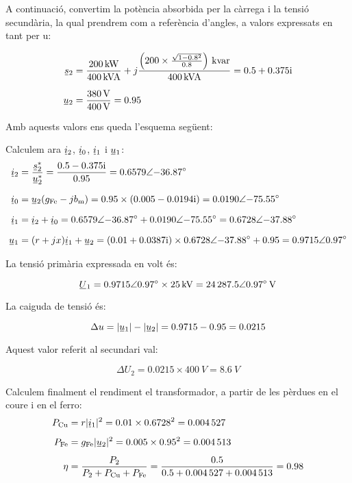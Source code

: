 \begin{exemple}
        A continuació, convertim la potència absorbida per la càrrega i la tensió secundària, la qual prendrem com a referència d'angles,  a valors expressats en tant per u:
        
  \begin{align*}
    \cmplx{s}_2 &= \frac{\qty{200}{kW}}{\qty{400}{kVA}} + j \frac{\left(200\times \frac{\sqrt{1-\num{0,8}^2}}{\num{0,8}}\right)\unit{\,kvar}}{\qty{400}{kVA}} =
    \complexnum{0,5 + j 0,375}\\[1.5ex]
    \cmplx{u}_2 &= \frac{\qty{380}{V}}{\qty{400}{V}} = \num{0,95}
  \end{align*}

    Amb aquests valors ens queda l'esquema següent:

    \begin{center}
        
    \end{center}

    Calculem ara $\cmplx{i}_2$, $\cmplx{i}_0$, $\cmplx{i}_1$ i $\cmplx{u}_1$:
    \begin{align*}
    \cmplx{i}_2 &= \frac{\cmplx{s}_2^*}{\cmplx{u}_2^*} = \frac{\complexnum{0,5 - j 0,375}}{\num{0,95}} = \complexnum{0,6579:-36,87} \\[1.5ex]
    \cmplx{i}_0 &= \cmplx{u}_2 (g\ped{Fe}-j b\ped{m}) = \num{0,95}\times(\complexnum{0,005-j0,0194}) = \complexnum{0,0190:-75,55} \\[1.5ex]
    \cmplx{i}_1 &= \cmplx{i}_2 + \cmplx{i}_0 =\complexnum{0,6579:-36,87} +\complexnum{0,0190:-75,55} = \complexnum{0,6728:-37,88} \\[1.5ex]
    \cmplx{u}_1 &=(r+j x) \cmplx{i}_1 + \cmplx{u}_2 = (\complexnum{0,01+j 0,0387}) \times \complexnum{0,6728:-37,88} + \num{0,95} =
    \complexnum{0,9715:0,97}
  \end{align*}

  La tensió primària expressada en volt és:
  
  \[
    \cmplx{U}_1 = \complexnum{0,9715:0,97}\times \qty{25}{kV} = \complexqty{24287,5:0,97}{V}
  \]

   La caiguda de tensió és:
   
   \[
        \Delta u = |\cmplx{u}_1| - |\cmplx{u}_2| = \num{0,9715} - \num{0,95} = \num{0,0215}
   \]

   Aquest valor referit al secundari val:
   
   \[
        \Delta U_2 =\num{0,0215}\times \qty{400}{V} = \qty{8,6}{V}
   \]

   Calculem finalment el rendiment el transformador, a partir de les pèrdues en el coure  i en el ferro:
   \begin{align*}
    P\ped{Cu} &= r |\cmplx{i}_1|^2  = \num{0,01}\times \num{0,6728}^2 = \num{0,004527}\\[1ex]
    P\ped{Fe} &= g\ped{Fe} |\cmplx{u}_2|^2 = \num{0,005}\times \num{0,95}^2 = \num{0,004513}\\[1ex]
    \eta &= \frac{P_2}{P_2 + P\ped{Cu} + P\ped{Fe}} = \frac{\num{0,5}}{\num{0,5} + \num{0,004527} + \num{0,004513} } = \num{0,98}
  \end{align*}


\end{exemple}
